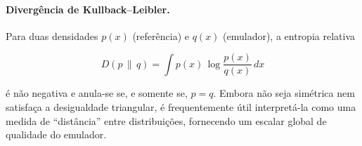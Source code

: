 \paragraph{Divergência de Kullback--Leibler.} Para duas densidades $p(x)$ (referência) e $q(x)$ (emulador), a entropia relativa \citep{kullback1951, cover2006}

\begin{equation}
D(p \,\|\, q) = \int p(x)\, \log \frac{p(x)}{q(x)}\, dx
\label{eq:kl_continua}
\end{equation}

\noindent é não negativa e anula-se se, e somente se, $p = q$. Embora não seja simétrica nem satisfaça a desigualdade triangular, é frequentemente útil interpretá-la como uma medida de ``distância'' entre distribuições, fornecendo um escalar global de qualidade do emulador.
